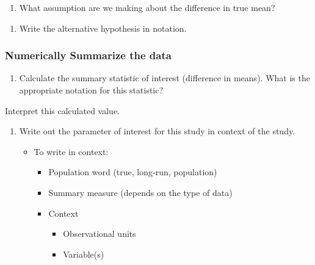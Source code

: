 \documentclass[
]{report}
\providecommand{\tightlist}{%
  \setlength{\itemsep}{0pt}\setlength{\parskip}{0pt}}
\begin{document}
\begin{enumerate}
\def\labelenumi{\arabic{enumi}.}
\setcounter{enumi}{3}
\tightlist
\item
  What assumption are we making about the difference in true mean?
\end{enumerate}

\vspace{0.8in}

\begin{enumerate}
\def\labelenumi{\arabic{enumi}.}
\setcounter{enumi}{4}
\tightlist
\item
  Write the alternative hypothesis in notation.
\end{enumerate}

\vspace{0.5in}

\subsubsection*{Numerically Summarize the data}\label{numerically-summarize-the-data}

\begin{enumerate}
\def\labelenumi{\arabic{enumi}.}
\setcounter{enumi}{5}
\tightlist
\item
  Calculate the summary statistic of interest (difference in means). What is the appropriate notation for this statistic?
\end{enumerate}

\vspace{0.5in}

Interpret this calculated value.

\vspace{0.6in}

\begin{enumerate}
\def\labelenumi{\arabic{enumi}.}
\setcounter{enumi}{6}
\item
  Write out the parameter of interest for this study in context of the study.

  \begin{itemize}
  \item
    To write in context:

    \begin{itemize}
    \item
      Population word (true, long-run, population)
    \item
      Summary measure (depends on the type of data)
    \item
      Context

      \begin{itemize}
      \item
        Observational units
      \item
        Variable(s)
        \vspace{1in}
      \end{itemize}
    \end{itemize}
  \end{itemize}
\end{enumerate}
\end{document}
